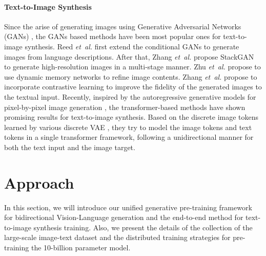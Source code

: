 \documentclass{article}
\begin{document}
\paragraph{Text-to-Image Synthesis}
Since the arise of generating images using Generative Adversarial Networks (GANs) \cite{goodfellow2014generative}, the GANs based methods have been most popular ones for text-to-image synthesis. Reed {\em et\ al.} \cite{reed2016generative} first extend the conditional GANs to generate images from language descriptions. After that, Zhang {\em et\ al.}  \cite{zhang2017stackgan} propose StackGAN to generate high-resolution images in a multi-stage manner. Zhu {\em et\ al.} \cite{zhu2019dm} propose to use dynamic memory networks to refine image contents. Zhang {\em et\ al.} \cite{zhang2021cross} propose to incorporate contrastive learning to improve the fidelity of the generated images to the textual input. Recently, inspired by the autoregressive generative models for pixel-by-pixel image generation \cite{chen2020generative}, the transformer-based methods \cite{ramesh2021zero,ding2021cogview} have shown promising results for text-to-image synthesis. Based on the discrete image tokens learned by various discrete VAE \cite{oord2017neural,esser2021taming}, they try to model the image tokens and text tokens in a single transformer framework, following a unidirectional manner for both the text input and the image target. 

\section{Approach}
In this section, we will introduce our unified generative pre-training framework for bidirectional Vision-Language generation and the end-to-end method for text-to-image synthesis training. Also, we present the details of the collection of the large-scale image-text dataset and the distributed training strategies for pre-training the 10-billion parameter model.
\end{document}
